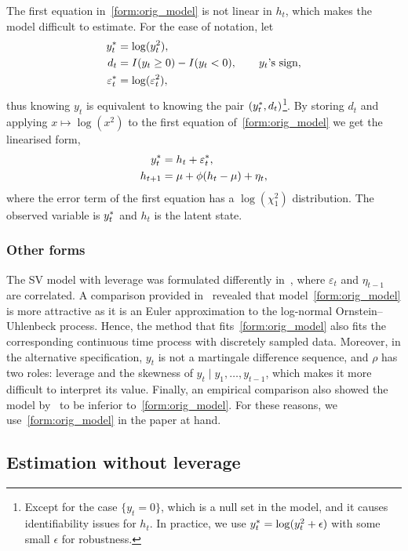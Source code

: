 The first equation in~\eqref{form:orig_model} is not linear in $h_t$, which makes the model difficult to estimate. For the ease of notation, let
\begin{align*}
y_t^\ast &=\log(y^2_t), \\
d_t &=I(y_t\ge0)-I(y_t<0), \qquad\text{$y_t$'s sign,} \\
\varepsilon_t^\ast &=\log(\varepsilon^2_t),
\end{align*}
thus knowing $y_t$ is equivalent to knowing the pair $(y_t^\ast, d_t)$\footnote{Except for the case $\{y_t=0\}$, which is a null set in the model, and it causes identifiability issues for $h_t$. In practice, we use $y_t^\ast =\log(y^2_t+\epsilon)$ with some small $\epsilon$ for robustness.}. By storing $d_t$ and applying $x\mapsto\log(x^2)$ to the first equation of~\eqref{form:orig_model} we get the linearised form,
\begin{align}
\begin{split}\label{form:lin_model}
y_t^\ast & = h_t+\varepsilon_t^\ast, \\
h_{t+1} & = \mu+\phi(h_t-\mu)+\eta_t,
\end{split}
\end{align}
where the error term of the first equation has a $\log(\chi_1^2)$ distribution. The observed variable is $y_t^\ast$ and $h_t$ is the latent state.

\subsubsection*{Other forms}

The SV model with leverage was formulated differently in~\citet{Jacquier2004}, where $\varepsilon_t$ and $\eta_{t-1}$ are correlated.
A comparison provided in~\citet{yu2005leverage} revealed that model~\eqref{form:orig_model} is more attractive as it is an Euler approximation to the log-normal Ornstein--Uhlenbeck process.
Hence, the method that fits~\eqref{form:orig_model} also fits the corresponding continuous time process with discretely sampled data.
Moreover, in the alternative specification, $y_t$ is not a martingale difference sequence, and $\rho$ has two roles: leverage and the skewness of $y_t\mid y_1,\dots,y_{t-1}$, which makes it more difficult to interpret its value.
Finally, an empirical comparison also showed the model by~\citet{Jacquier2004} to be inferior to~\ref{form:orig_model}.
For these reasons, we use~\eqref{form:orig_model} in the paper at hand.

\subsection{Estimation without leverage}


